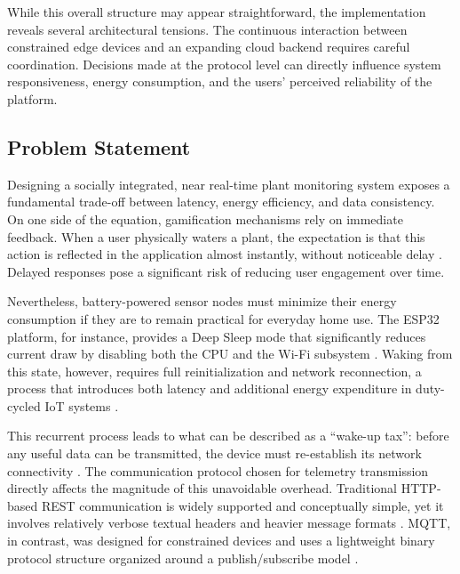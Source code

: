 While this overall structure may appear straightforward, the implementation reveals several architectural tensions. The continuous interaction between constrained edge devices and an expanding cloud backend requires careful coordination. Decisions made at the protocol level can directly influence system responsiveness, energy consumption, and the users' perceived reliability of the platform.

\subsection{Problem Statement}

Designing a socially integrated, near real-time plant monitoring system exposes a fundamental trade-off between latency, energy efficiency, and data consistency. On one side of the equation, gamification mechanisms rely on immediate feedback. When a user physically waters a plant, the expectation is that this action is reflected in the application almost instantly, without noticeable delay \cite{spinifyGamification}. Delayed responses pose a significant risk of reducing user engagement over time.

Nevertheless, battery-powered sensor nodes must minimize their energy consumption if they are to remain practical for everyday home use. The ESP32 platform, for instance, provides a Deep Sleep mode that significantly reduces current draw by disabling both the CPU and the Wi-Fi subsystem \cite{espIdfS3SleepModes}. Waking from this state, however, requires full reinitialization and network reconnection, a process that introduces both latency and additional energy expenditure in duty-cycled IoT systems \cite{kozlowskiSosnowskiDutyCycling2019}.

This recurrent process leads to what can be described as a ``wake-up tax'': before any useful data can be transmitted, the device must re-establish its network connectivity \cite{espIdfS3SleepModes, kozlowskiSosnowskiDutyCycling2019}. The communication protocol chosen for telemetry transmission directly affects the magnitude of this unavoidable overhead. Traditional HTTP-based REST communication is widely supported and conceptually simple, yet it involves relatively verbose textual headers and heavier message formats \cite{fieldingRest2000, rfc7230Http}. MQTT, in contrast, was designed for constrained devices and uses a lightweight binary protocol structure organized around a publish/subscribe model \cite{oasisMQTT, yokotaniSasaki2016MqttHttp, chenKunz2016IotProtocols}.


